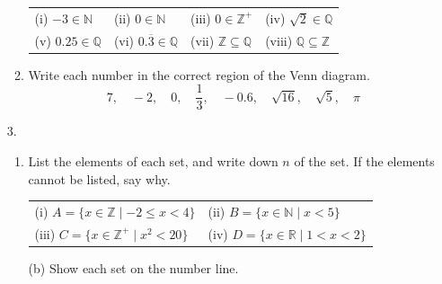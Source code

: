 \documentclass[12pt, twoside]{article}
\begin{document}
\begin{enumerate}[itemsep=0.15cm]
\begin{enumerate}[itemsep=0.15cm]
  \begin{tabular}{@{}p{}p{}p{}p{}}
  (i) $-3 \in \mathbb{N}$ & (ii) $0 \in \mathbb{N}$ & (iii) $0 \in \mathbb{Z}^{+}$ &
  (iv) $\sqrt{2} \in \mathbb{Q}$ \\[0.3cm]
  (v) $0.25 \in \mathbb{Q}$ & (vi) $0.\overline{3} \in \mathbb{Q}$ &
  (vii) $\mathbb{Z} \subseteq \mathbb{Q}$ & (viii) $\mathbb{Q} \subseteq \mathbb{Z}$
  \end{tabular}
  \vfill
  \item Write each number in the correct region of the Venn diagram.
  \[
  7, \quad -2, \quad 0, \quad \frac{1}{3}, \quad -0.6, \quad \sqrt{16}, \quad
  \sqrt{5}, \quad \pi
  \]
  \begin{center}
  \end{center}
  \vfill
\end{enumerate}

\item[3.]
\begin{enumerate}[itemsep=0.15cm]
  \item List the elements of each set, and write down $n$ of the set.
  If the elements cannot be listed, say why.

  \begin{tabular}{@{}p{}p{}}
  (i) $A = \{x \in \mathbb{Z} \mid -2 \le x < 4\}$ &
  (ii) $B = \{x \in \mathbb{N} \mid x < 5\}$ \\[0.3cm]
  (iii) $C = \{x \in \mathbb{Z}^{+} \mid x^{2} < 20\}$ &
  (iv) $D = \{x \in \mathbb{R} \mid 1 < x < 2\}$
  \end{tabular}
  \vfill
\end{enumerate}

\newpage

\begin{enumerate}[itemsep=0.15cm]
  \item[(b)] Show each set on the number line.


\end{enumerate}
\end{enumerate}
\end{document}
